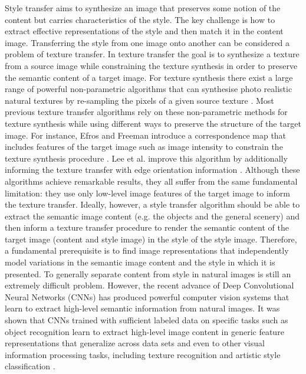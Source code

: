 \hspace{0.5cm} Style transfer aims to synthesize an image that
preserves some notion of the content but carries characteristics of the style. The key challenge is how to extract effective representations of the style and then match it in the content image.
Transferring the style from one image onto another can be considered a problem of texture transfer. In texture transfer the goal is to synthesize a texture from a source image while constraining the texture synthesis in order to preserve the semantic content of a target image. For texture synthesis there exist a large range of powerful non-parametric algorithms that can synthesise photo realistic natural textures by re-sampling the pixels of a given source texture \cite{bib1, bib2, bib3, bib4}. Most previous texture transfer algorithms rely on these non-parametric methods for texture synthesis while using different ways to preserve the structure of the target image. For instance, Efros and Freeman introduce a correspondence map that includes features of the target image such as image intensity to constrain the texture synthesis procedure \cite{bib3}. Lee et al. improve this algorithm by additionally informing the texture transfer with edge orientation information \cite{bib5}. Although these algorithms achieve remarkable results, they all suffer from the same fundamental limitation: they use only low-level image features of the target image to inform the texture transfer. Ideally, however, a style transfer algorithm should be able to extract the semantic image content (e.g. the objects and the general scenery) and then inform a texture transfer procedure to render the semantic content of the target image (content and style image) in the style of the style image. Therefore, a fundamental prerequisite is to find image representations that independently model variations in the semantic image content and the style in which it is presented.
To generally separate content from style in natural images is still an extremely difficult problem.\newline
However, the recent advance of Deep Convolutional Neural Networks (CNNs) \cite{bib6} has produced powerful computer vision systems that learn to extract high-level semantic information from natural images.  It was shown that CNNs trained with sufficient labeled data on specific tasks such as object recognition learn to extract high-level image content in generic feature representations that generalize across data sets \cite{bib7} and even to other visual information processing tasks, including texture recognition \cite{bib8} and artistic style classification \cite{bib15}.\newline
